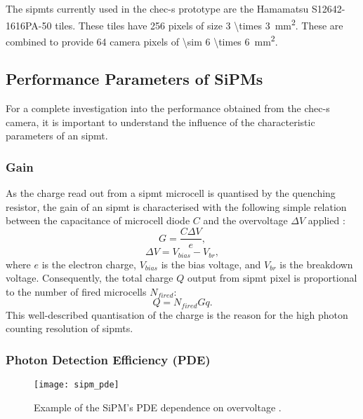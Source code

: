 The \glspl{sipmt} currently used in the \gls{chec-s} prototype are the Hamamatsu S12642-1616PA-50 tiles. These tiles have 256 pixels of size \SI[parse-numbers = false]{3 \times 3}{mm\squared}. These are combined to provide 64 camera pixels of \SI[parse-numbers = false]{\sim 6 \times 6}{mm\squared}.

\subsection{Performance Parameters of SiPMs} \label{section:sipmt}

For a complete investigation into the performance obtained from the \gls{chec-s} camera, it is important to understand the influence of the characteristic parameters of an \gls{sipmt}.

\subsubsection{Gain}

As the charge read out from a \gls{sipmt} microcell is quantised by the quenching resistor, the gain of an \gls{sipmt} is characterised with the following simple relation between the capacitance of microcell diode $C$ and the overvoltage $\Delta V$ applied \cite{SensL2011}:
\begin{equation} \label{eq:sipmt_gain}
G = \frac{C \Delta V}{e},
\end{equation}
\begin{equation} \label{eq:sipmt_voltage}
\Delta V = V_{bias} - V_{br},
\end{equation}
where $e$ is the electron charge, $V_{bias}$ is the bias voltage, and $V_{br}$ is the breakdown voltage. Consequently, the total charge $Q$ output from \gls{sipmt} pixel is proportional to the number of fired microcells $N_{fired}$:
\begin{equation} \label{eq:sipmt_charge}
Q = N_{fired} G q.
\end{equation}
This well-described quantisation of the charge is the reason for the high photon counting resolution of \glspl{sipmt}.

\subsubsection{Photon Detection Efficiency (PDE)}

\begin{figure}
	\centering
    \texttt{[image: sipm\_pde]} 
	\caption[Example of the SiPM's PDE dependence on overvoltage.]{Example of the SiPM's PDE dependence on overvoltage \cite{SensL2011}.}
	\label{fig:sipm_pde}
\end{figure}

